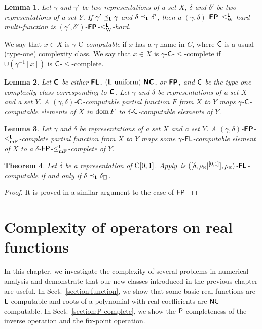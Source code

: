 \documentclass{article}
\newtheorem{theorem}{Theorem}[section]
\newtheorem{lemma}[theorem]{Lemma}
\theoremstyle{definition}
\theoremstyle{remark}
\begin{document}
\begin{lemma}
 Let $\gamma$ and $\gamma'$ be two representations of a set $X$, 
 $\delta$ and $\delta'$ be two representations of a set $Y$.
 If $\gamma' \preceq_{\text{\bfseries \sffamily \upshape L}} \gamma$ and $\delta \preceq_{\text{\bfseries \sffamily \upshape L}} \delta'$,
 then a $(\gamma, \delta)$-$\text{\bfseries \sffamily \upshape FP}$-$\leq _{\mathrm W} ^{\text{\bfseries \sffamily \upshape L}}$-hard multi-function is
 $(\gamma', \delta')$-$\text{\bfseries \sffamily \upshape FP}$-$\leq _{\mathrm W} ^{\text{\bfseries \sffamily \upshape L}}$-hard.
\end{lemma}

We say that $x \in X$ is \emph{$\gamma$-$\mathrm C$-computable} if
$x$ has a $\gamma$ name in $C$,
where $\mathsf{C}$ is a usual (type-one) complexity class.
We say that $x \in X$ is $\gamma$-$\mathsf{C}$-$\le$-complete if
$\cup(\gamma^{-1}[x])$ is $\mathsf{C}$-$\le$-complete.

\begin{lemma}
 Let $\text{\bfseries \sffamily \upshape C}$ be either $\text{\bfseries \sffamily \upshape FL}$, $(\text{\bfseries \sffamily \upshape L}\text{-uniform})\ \text{\bfseries \sffamily \upshape NC}$, 
 or $\text{\bfseries \sffamily \upshape FP}$, and $\mathsf{C}$ be the type-one complexity class
 corresponding to $\text{\bfseries \sffamily \upshape C}$.
 Let $\gamma$ and $\delta$ be representations of a set $X$ and a set $Y$.
 A $(\gamma, \delta)$-$\mathbf C$-computable partial function $F$ from $X$
 to $Y$ maps $\gamma$-$\mathsf{C}$-computable elements of $X$
 in $\mathop{\rm dom} F$ to $\delta$-$\mathsf{C}$-computable elements of $Y$.
\end{lemma}

\begin{lemma}
 \label{lemma:p-comp-maps-l-to-p-comp}
 Let $\gamma$ and $\delta$ be representations of a set $X$ and a set $Y$.
 A $(\gamma, \delta)$-$\text{\bfseries \sffamily \upshape FP}$-$\leq _{\mathrm{mF}} ^{\text{\bfseries \sffamily \upshape L}}$-complete partial function 
 from $X$ to $Y$ maps some $\gamma$-$\mathsf{FL}$-computable element of $X$
 to a $\delta$-$\mathsf{FP}$-$\leq _{\mathrm{mF}}^{\mathsf{L}}$-complete of $Y$.
\end{lemma}



\begin{theorem}
 Let $\delta$ be a representation of $\mathrm C[0, 1]$.
 $\mathit{Apply}$ is $([\delta, \rho _\mathbb R|^{[0,1]}], \rho _\mathbb R)$-$\text{\bfseries \sffamily \upshape FL}$-computable if
 and only if $\delta \preceq_{\text{\bfseries \sffamily \upshape L}} \delta _\square$.
\end{theorem}

\begin{proof}
 It is proved in a similar argument to the case of $\mathsf{FP}$ \cite{kawamura11:_funct_space_repres_and_polyn_time_comput}
\end{proof}





\section{Complexity of operators on real functions}
\label{chapter:applications}
In this chapter, we investigate the complexity of several problems in numerical
analysis and demonstrate that our new classes introduced in the previous
chapter are useful.
In Sect.~\ref{section:function}, 
we show that some basic real functions are $\mathsf{L}$-computable and
roots of a polynomial with real coefficients are $\mathsf{NC}$-computable.
In Sect.~\ref{section:P-complete}, we show the $\mathsf{P}$-completeness of 
the inverse operation and the fix-point operation.
\end{document}

